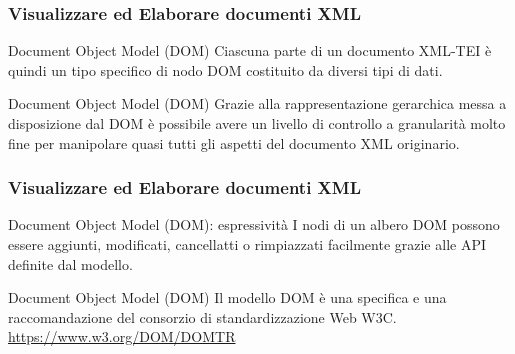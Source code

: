 \begin{frame}
    \frametitle{Visualizzare ed Elaborare documenti XML}
    \addtocounter{nframe}{1}
    

     \begin{block}{Document Object Model (DOM)}
        Ciascuna parte di un documento XML-TEI è quindi un tipo specifico di nodo DOM costituito da diversi tipi di dati.
     \end{block}

     \begin{block}{Document Object Model (DOM)}
        Grazie alla rappresentazione gerarchica messa a disposizione dal DOM è possibile avere un livello di controllo a granularità molto fine per manipolare quasi tutti gli aspetti del documento XML originario.
     \end{block}
     
\end{frame}

\begin{frame}
    \frametitle{Visualizzare ed Elaborare documenti XML}
    \addtocounter{nframe}{1}
    

     \begin{block}{Document Object Model (DOM): espressività}
       I nodi di un albero DOM possono essere aggiunti, modificati, cancellatti o rimpiazzati facilmente grazie alle API definite dal modello.
     \end{block}

     \begin{block}{Document Object Model (DOM)}
        Il modello DOM è una specifica e una raccomandazione del consorzio di standardizzazione Web W3C.
        \\\url{https://www.w3.org/DOM/DOMTR}
     \end{block}
     
\end{frame}

